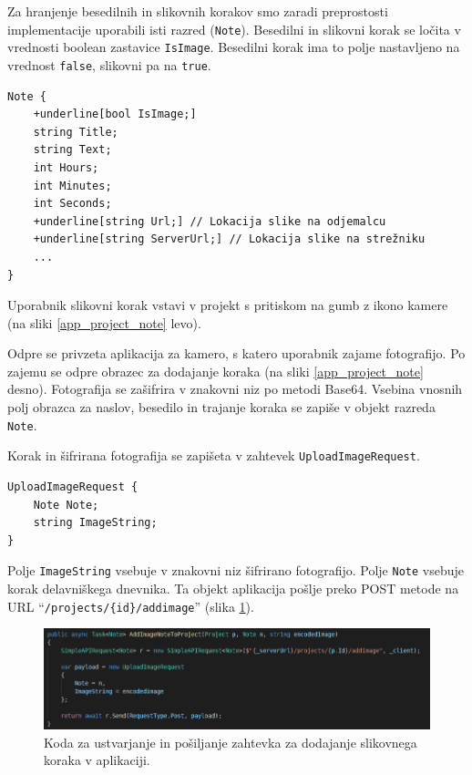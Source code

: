 \documentclass[a4paper, 12pt]{book}
\begin{document}
Za hranjenje besedilnih in slikovnih korakov smo zaradi preprostosti implementacije uporabili isti razred (\texttt{Note}).
Besedilni in slikovni korak se ločita v vrednosti boolean zastavice \texttt{IsImage}.
Besedilni korak ima to polje nastavljeno na vrednost \texttt{false}, slikovni pa na \texttt{true}.

\begin{Verbatim}[commandchars=+\[\]]
Note { 
    +underline[bool IsImage;]
    string Title; 
    string Text; 
    int Hours; 
    int Minutes;
    int Seconds; 
    +underline[string Url;] // Lokacija slike na odjemalcu 
    +underline[string ServerUrl;] // Lokacija slike na strežniku
    ... 
}
\end{Verbatim}

Uporabnik slikovni korak vstavi v projekt s pritiskom na gumb z ikono kamere (na sliki \ref{app_project_note} levo).

Odpre se privzeta aplikacija za kamero, s katero uporabnik zajame fotografijo.
Po zajemu se odpre obrazec za dodajanje koraka (na sliki \ref{app_project_note} desno).
Fotografija se zašifrira v znakovni niz po metodi Base64.
Vsebina vnosnih polj obrazca za naslov, besedilo in trajanje koraka se zapiše v objekt razreda \texttt{Note}.

Korak in šifrirana fotografija se zapišeta v zahtevek \texttt{UploadImageRequest}.

\begin{verbatim}
UploadImageRequest { 
    Note Note; 
    string ImageString; 
}
\end{verbatim}

Polje \texttt{ImageString} vsebuje v znakovni niz šifrirano fotografijo.
Polje \texttt{Note} vsebuje korak delavniškega dnevnika.
Ta objekt aplikacija pošlje preko POST metode na URL \enquote{\texttt{/projects/\{id\}/addimage}} (slika \ref{app_code_image}).

\begin{figure}[H]
\begin{center}
	\includegraphics[width=13.5cm]{app_code_image}
\end{center}
	\caption{Koda za ustvarjanje in pošiljanje zahtevka za dodajanje slikovnega koraka v aplikaciji.}
\label{app_code_image}
\end{figure}
\end{document}
